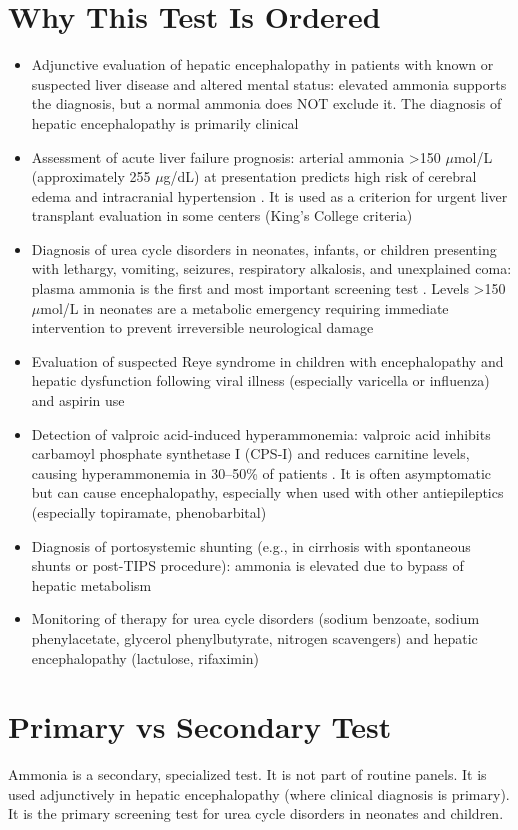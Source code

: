 \section*{Why This Test Is Ordered}
\begin{itemize}
  \item Adjunctive evaluation of hepatic encephalopathy in patients with known or suspected liver disease and altered mental status: elevated ammonia supports the diagnosis, but a normal ammonia does NOT exclude it. The diagnosis of hepatic encephalopathy is primarily clinical
  \item Assessment of acute liver failure prognosis: arterial ammonia >150 $\mu$mol/L (approximately 255 $\mu$g/dL) at presentation predicts high risk of cerebral edema and intracranial hypertension \cite{clemmesen1999cerebral}. It is used as a criterion for urgent liver transplant evaluation in some centers (King's College criteria)
  \item Diagnosis of urea cycle disorders in neonates, infants, or children presenting with lethargy, vomiting, seizures, respiratory alkalosis, and unexplained coma: plasma ammonia is the first and most important screening test \cite{haeberle2012suggested}. Levels >150 $\mu$mol/L in neonates are a metabolic emergency requiring immediate intervention to prevent irreversible neurological damage
  \item Evaluation of suspected Reye syndrome in children with encephalopathy and hepatic dysfunction following viral illness (especially varicella or influenza) and aspirin use
  \item Detection of valproic acid-induced hyperammonemia: valproic acid inhibits carbamoyl phosphate synthetase I (CPS-I) and reduces carnitine levels, causing hyperammonemia in 30--50\% of patients \cite{wadzinski2007valproate}. It is often asymptomatic but can cause encephalopathy, especially when used with other antiepileptics (especially topiramate, phenobarbital)
  \item Diagnosis of portosystemic shunting (e.g., in cirrhosis with spontaneous shunts or post-TIPS procedure): ammonia is elevated due to bypass of hepatic metabolism
  \item Monitoring of therapy for urea cycle disorders (sodium benzoate, sodium phenylacetate, glycerol phenylbutyrate, nitrogen scavengers) and hepatic encephalopathy (lactulose, rifaximin)
\end{itemize}

\section*{Primary vs Secondary Test}
Ammonia is a secondary, specialized test. It is not part of routine panels. It is used adjunctively in hepatic encephalopathy (where clinical diagnosis is primary). It is the primary screening test for urea cycle disorders in neonates and children.


